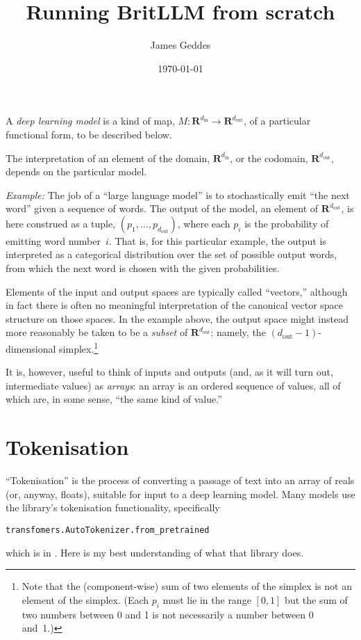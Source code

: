 \documentclass[11pt, a4paper]{article}
\title{Running BritLLM from scratch}
\author{James Geddes}
\date{\today}
\newcommand{\setR}{\mathbold{R}}
\begin{document}
\maketitle

A \emph{deep learning model} is a kind of map,
$M\colon \setR^{d_\text{in}} \to \setR^{d_\text{out}}$, of a particular
functional form, to be described below.

The interpretation of an element of the domain, $\setR^{d_\text{in}}$,
or the codomain, $\setR^{d_\text{out}}$, depends on the particular
model.

\emph{Example:} The job of a ``large language model'' is to
stochastically emit ``the next word'' given a sequence of words. The
output of the model, an element of $\setR^{d_\text{out}}$, is here
construed as a tuple, $(p_1, \dotsc, p_{d_\text{out}})$, where each
$p_i$ is the probability of emitting word number~$i$. That is, for
this particular example, the output is interpreted as a categorical
distribution over the set of possible output words, from which the
next word is chosen with the given probabilities.

Elements of the input and output spaces are typically called
``vectors,'' although in fact there is often no meaningful
interpretation of the canonical vector space structure on those
spaces. In the example above, the output space might instead more
reasonably be taken to be a \emph{subset} of $\setR^{d_\text{out}}$:
namely, the $(d_\text{out}-1)$-dimensional simplex.\footnote{Note that
  the (component-wise) sum of two elements of the simplex is not an
  element of the simplex. (Each $p_i$ must lie in the range $[0,1]$
  but the sum of two numbers between 0 and 1 is not necessarily a
  number between 0 and~1.)}

It is, however, useful to think of inputs and outputs (and, as it will
turn out, intermediate values) as \emph{arrays}: an array is an
ordered sequence of values, all of which are, in some sense, ``the
same kind of value.''



\appendix
\section{Tokenisation}

``Tokenisation'' is the process of converting a passage of text into
an array of reals (or, anyway, floats), suitable for input to a deep
learning model\@. Many models use the  library's
tokenisation functionality, specifically
\begin{verbatim}
transfomers.AutoTokenizer.from_pretrained
\end{verbatim}
which is in . Here is my best
understanding of what that library does.
\end{document}
